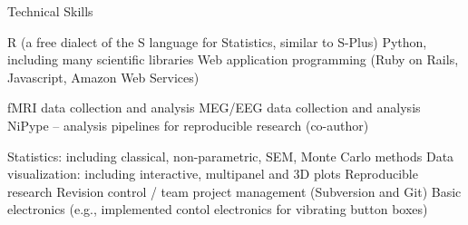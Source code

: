 \begin{rubric}{Technical Skills}

\entry* R (a free dialect of the S language for Statistics, similar to S-Plus)
\entry* Python, including many scientific libraries
\entry* Web application programming (Ruby on Rails, Javascript, Amazon Web
Services)

\entry* fMRI data collection and analysis
\entry* MEG/EEG data collection and analysis
\entry* NiPype -- analysis pipelines for reproducible research (co-author)

\entry* Statistics: including classical, non-parametric, SEM, Monte Carlo methods
\entry* Data visualization: including interactive, multipanel and 3D plots
\entry* Reproducible research
\entry* Revision control / team project management (Subversion and Git)
\entry* Basic electronics (e.g., implemented contol electronics for vibrating button
boxes)

\end{rubric}
